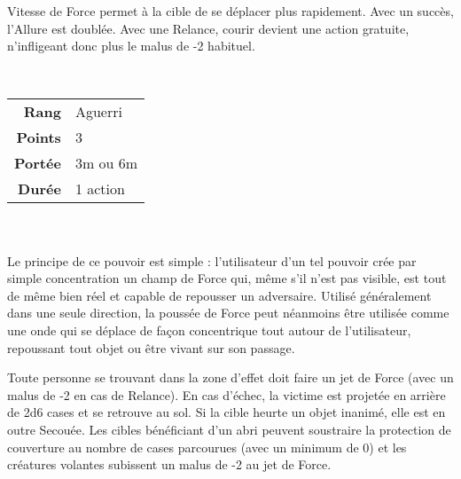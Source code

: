 \begin{description}[align=left]
        Vitesse de Force permet à la cible de se déplacer plus rapidement. Avec un succès, l’Allure est doublée. Avec une Relance, courir devient une action gratuite, n’infligeant donc plus le malus de -2 habituel. 
        \\

    \item [Poussée de Force] ~ \\

        \begin{tabular}{ r l }
            \textbf{Rang}    & Aguerri \\
            \textbf{Points}  & 3 \\
            \textbf{Portée}  & 3m ou 6m \\
            \textbf{Durée}   & 1 action \\
        \end{tabular}
        \\ \\
        Le principe de ce pouvoir est simple : l’utilisateur d’un tel pouvoir crée par simple concentration un champ de Force qui, même s’il n’est pas visible, est tout de même bien réel et capable de repousser un adversaire. Utilisé généralement dans une seule direction, la poussée de Force peut néanmoins être utilisée comme une onde qui se déplace de façon concentrique tout autour de l’utilisateur, repoussant tout objet ou être vivant sur son passage. 

        Toute personne se trouvant dans la zone d’effet doit faire un jet de Force (avec un malus de -2 en cas de Relance). En cas d’échec, la victime est projetée en arrière de 2d6 cases et se retrouve au sol. Si la cible heurte un objet inanimé, elle est en outre Secouée. Les cibles bénéficiant d’un abri peuvent soustraire la protection de couverture au nombre de cases parcourues (avec un minimum de 0) et les créatures volantes subissent un malus de -2 au jet de Force.
        \\

\end{description}

